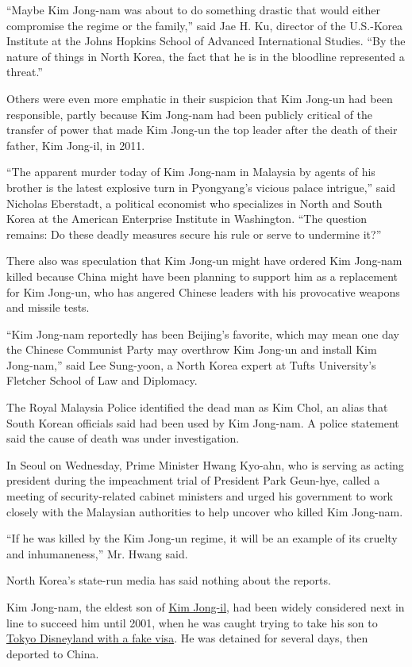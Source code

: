 ``Maybe Kim Jong-nam was about to do something drastic that would either
compromise the regime or the family,'' said Jae H. Ku, director of the
U.S.-Korea Institute at the Johns Hopkins School of Advanced
International Studies. ``By the nature of things in North Korea, the
fact that he is in the bloodline represented a threat.''

Others were even more emphatic in their suspicion that Kim Jong-un had
been responsible, partly because Kim Jong-nam had been publicly critical
of the transfer of power that made Kim Jong-un the top leader after the
death of their father, Kim Jong-il, in 2011.

``The apparent murder today of Kim Jong-nam in Malaysia by agents of his
brother is the latest explosive turn in Pyongyang's vicious palace
intrigue,'' said Nicholas Eberstadt, a political economist who
specializes in North and South Korea at the American Enterprise
Institute in Washington. ``The question remains: Do these deadly
measures secure his rule or serve to undermine it?''

There also was speculation that Kim Jong-un might have ordered Kim
Jong-nam killed because China might have been planning to support him as
a replacement for Kim Jong-un, who has angered Chinese leaders with his
provocative weapons and missile tests.

``Kim Jong-nam reportedly has been Beijing's favorite, which may mean
one day the Chinese Communist Party may overthrow Kim Jong-un and
install Kim Jong-nam,'' said Lee Sung-yoon, a North Korea expert at
Tufts University's Fletcher School of Law and Diplomacy.

The Royal Malaysia Police identified the dead man as Kim Chol, an alias
that South Korean officials said had been used by Kim Jong-nam. A police
statement said the cause of death was under investigation.

In Seoul on Wednesday, Prime Minister Hwang Kyo-ahn, who is serving as
acting president during the impeachment trial of President Park
Geun-hye, called a meeting of security-related cabinet ministers and
urged his government to work closely with the Malaysian authorities to
help uncover who killed Kim Jong-nam.

``If he was killed by the Kim Jong-un regime, it will be an example of
its cruelty and inhumaneness,'' Mr. Hwang said.

North Korea's state-run media has said nothing about the reports.

Kim Jong-nam, the eldest son of
\href{http://www.nytimes.com/2011/12/19/world/asia/kim-jong-il-is-dead.html?pagewanted=all}{Kim
Jong-il}, had been widely considered next in line to succeed him until
2001, when he was caught trying to take his son to
\href{http://www.nytimes.com/2001/05/04/world/japan-deports-man-said-to-be-north-korean-leader-s-son.html}{Tokyo
Disneyland with a fake visa}. He was detained for several days, then
deported to China.

